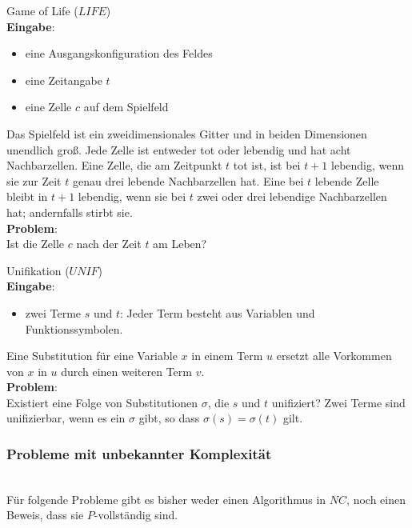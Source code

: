 \begin{problem}
    Game of Life ($LIFE$) \\
    \textbf{Eingabe}:
    \begin{itemize}
        \item eine Ausgangskonfiguration des Feldes
        \item eine Zeitangabe $t$
        \item eine Zelle $c$ auf dem Spielfeld
    \end{itemize}
    Das Spielfeld ist ein zweidimensionales Gitter und in beiden Dimensionen
    unendlich groß.
    Jede Zelle ist entweder tot oder lebendig und hat acht Nachbarzellen.
    Eine Zelle, die am Zeitpunkt $t$ tot ist, ist bei $t+1$ lebendig,
    wenn sie zur Zeit $t$ genau drei lebende Nachbarzellen hat.
    Eine bei $t$ lebende Zelle bleibt in $t+1$ lebendig, wenn sie bei $t$ zwei
    oder drei lebendige Nachbarzellen hat; andernfalls stirbt sie. \\
    \textbf{Problem}: \\
    Ist die Zelle $c$ nach der Zeit $t$ am Leben?
    \cite[S.211]{greenlaw}
\end{problem}

\begin{problem}
    Unifikation ($UNIF$) \\
    \textbf{Eingabe}:
    \begin{itemize}
        \item zwei Terme $s$ und $t$: Jeder Term besteht aus Variablen und
            Funktionssymbolen.
    \end{itemize}
    Eine Substitution für eine Variable $x$ in einem Term $u$ ersetzt alle
    Vorkommen von $x$ in $u$ durch einen weiteren Term $v$. \\
    \textbf{Problem}: \\
    Existiert eine Folge von Substitutionen $\sigma$, die $s$ und $t$
    unifiziert?
    Zwei Terme sind unifizierbar, wenn es ein $\sigma$ gibt, so dass
    $\sigma(s) = \sigma(t)$ gilt.
    \cite[S.171]{greenlaw}
\end{problem}

\subsubsection{Probleme mit unbekannter Komplexität} \hfill \\
Für folgende Probleme gibt es bisher weder einen Algorithmus in $NC$,
noch einen Beweis, dass sie $P$-vollständig sind.


